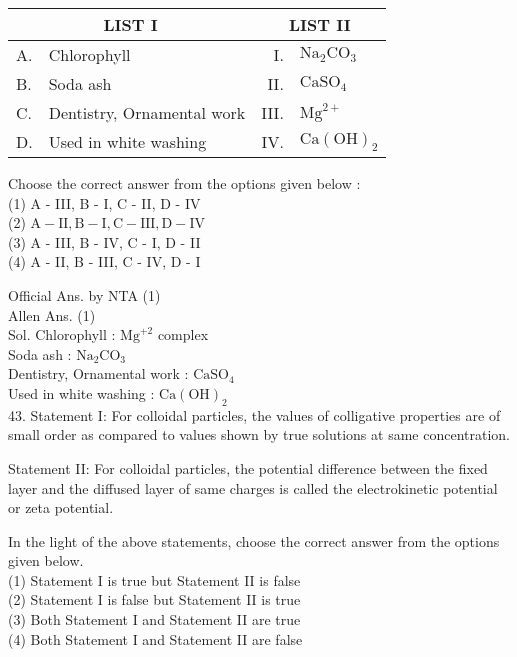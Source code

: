 \documentclass[10pt]{article}
\begin{document}
\begin{center}
\begin{tabular}{|l|l|r|l|}
\hline
\multicolumn{2}{|c|}{LIST I} & \multicolumn{2}{c|}{LIST II} \\
\hline
A. & Chlorophyll & I. & \(\mathrm{Na}_{2} \mathrm{CO}_{3}\) \\
\hline
B. & Soda ash & II. & \(\mathrm{CaSO}_{4}\) \\
\hline
C. & Dentistry, Ornamental work & III. & \(\mathrm{Mg}^{2+}\) \\
\hline
D. & Used in white washing & IV. & \(\mathrm{Ca}(\mathrm{OH})_{2}\) \\
\hline
\end{tabular}
\end{center}

Choose the correct answer from the options given below :\\
(1) A - III, B - I, C - II, D - IV\\
(2) \(\mathrm{A}-\mathrm{II}, \mathrm{B}-\mathrm{I}, \mathrm{C}-\mathrm{III}, \mathrm{D}-\mathrm{IV}\)\\
(3) A - III, B - IV, C - I, D - II\\
(4) A - II, B - III, C - IV, D - I

Official Ans. by NTA (1)\\
Allen Ans. (1)\\
Sol. Chlorophyll : \(\mathrm{Mg}^{+2}\) complex\\
Soda ash : \(\mathrm{Na}_{2} \mathrm{CO}_{3}\)\\
Dentistry, Ornamental work : \(\mathrm{CaSO}_{4}\)\\
Used in white washing : \(\mathrm{Ca}(\mathrm{OH})_{2}\)\\
43. Statement I: For colloidal particles, the values of colligative properties are of small order as compared to values shown by true solutions at same concentration.

Statement II: For colloidal particles, the potential difference between the fixed layer and the diffused layer of same charges is called the electrokinetic potential or zeta potential.

In the light of the above statements, choose the correct answer from the options given below.\\
(1) Statement I is true but Statement II is false\\
(2) Statement I is false but Statement II is true\\
(3) Both Statement I and Statement II are true\\
(4) Both Statement I and Statement II are false
\end{document}
